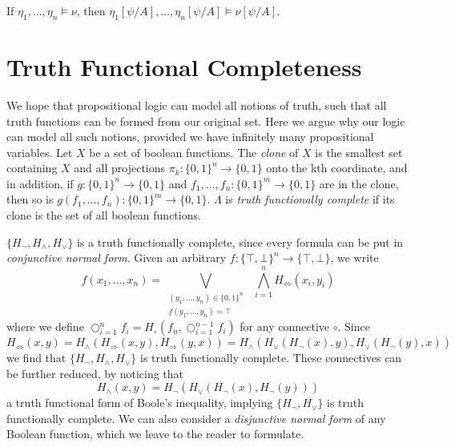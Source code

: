 \begin{corollary}
    If $\eta_1, \dots, \eta_n \vDash \nu$, then $\eta_1[\psi/A], \dots, \eta_n[\psi/A] \vDash \nu[\psi/A]$.
\end{corollary}

\section{Truth Functional Completeness}

We hope that propositional logic can model all notions of truth, such that all truth functions can be formed from our original set. Here we argue why our logic can model all such notions, provided we have infinitely many propositional variables. Let $X$ be a set of boolean functions. The \emph{clone} of $X$ is the smallest set containing $X$ and all projections $\pi_k : \{ 0, 1 \}^n \to \{ 0, 1 \}$ onto the kth coordinate, and in addition, if $g: \{ 0, 1 \}^n \to \{ 0, 1 \}$ and $f_1, \dots, f_n : \{ 0, 1 \}^m \to \{ 0, 1 \}$ are in the clone, then so is $g(f_1, \dots, f_n): \{ 0, 1 \}^m \to \{ 0, 1 \}$. $\Lambda$ is \emph{truth functionally complete} if its clone is the set of all boolean functions.

\begin{example}
    $\{ H_\neg, H_\wedge, H_\vee \}$ is a truth functionally complete, since every formula can be put in \emph{conjunctive normal form}. Given an arbitrary $f: \{ \top, \bot \}^n \to \{ \top, \bot \}$, we write
    \[ f(x_1, \dots, x_n) = \bigvee_{\substack{(y_1, \dots, y_n) \in \{ 0, 1 \}^n\\f(y_1, \dots, y_n) = \top}}\ \  \bigwedge_{i = 1}^n H_\Leftrightarrow(x_i, y_i) \]
    where we define $\bigcirc_{i = 1}^n f_i = H_\circ(f_n, \bigcirc_{i = 1}^{n-1} f_i)$ for any connective $\circ$. Since
    \[ H_\Leftrightarrow(x,y) = H_\wedge(H_\Rightarrow(x,y), H_\Rightarrow(y,x)) = H_\wedge(H_\vee(H_\neg(x), y), H_\vee(H_\neg(y), x)) \]
    we find that $\{ H_\neg, H_\wedge, H_\vee \}$ is truth functionally complete. These connectives can be further reduced, by noticing that
    \[ H_\wedge(x,y) = H_\neg(H_\vee(H_\neg(x), H_\neg(y))) \]
    a truth functional form of Boole's inequality, implying $\{ H_\neg, H_\vee \}$ is truth functionally complete. We can also consider a \emph{disjunctive normal form} of any Boolean function, which we leave to the reader to formulate.
\end{example}


